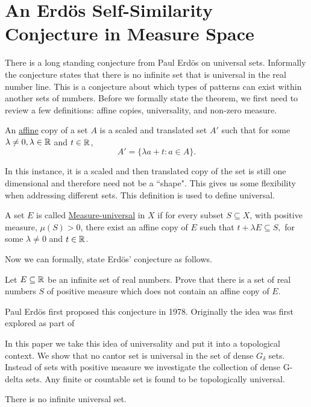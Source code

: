 \section{An Erd\"{o}s Self-Similarity Conjecture in Measure Space}
There is a long standing conjecture from Paul Erd\"{o}s on universal sets.  Informally the conjecture states that there is no infinite set that is universal in the real number line.  This is a conjecture about which types of  patterns can exist within another sets of numbers.  Before we formally state the theorem, we first need to review a few definitions: affine copies, universality, and non-zero measure. 
\begin{definition}
    An \underline{affine} copy of a set $A$ is a scaled and translated set $A'$ such that for some $\lambda\neq 0, \lambda \in \mathbb{R}$ and $t \in \mathbb{R}$,  $$A' = \{\lambda a + t : a \in A\}.$$
\end{definition}
In this instance, it is a scaled and then translated copy of the set is still one dimensional and therefore need not be a ``shape".  This gives us some flexibility when addressing different sets.  This definition is used to define universal. 

\begin{definition}
    A set $E$ is called \underline{Measure-universal} in $X$ if for every subset $S \subseteq X$, with positive measure, $\mu (S) > 0$, there exist an affine copy of $E$ such that $t+\lambda E \subseteq S,$ for some $\lambda \neq 0$ and $t \in \mathbb{R}$.  
\end{definition}

Now we can formally, state Erd\"{o}s' conjecture as follows. 

\begin{conjecture}\label{ErdConj}
    Let $E\subseteq \mathbb{R}$ be an infinite set of real numbers.  Prove that there is a set of real numbers $S$ of positive measure which does not contain an affine copy of $E$.  
\end{conjecture}

Paul Erd\"{o}s first proposed this conjecture in 1978.  Originally the idea was first explored as part of 

In this paper we take this idea of universality and put it into a topological context.  We show that no cantor set is universal in the set of dense $G_\delta$ sets.  Instead of sets with positive measure we investigate the collection of dense G-delta sets.  Any finite or countable set is found to be topologically universal. 


\begin{conjecture}
    There is no infinite universal set. 
\end{conjecture}


